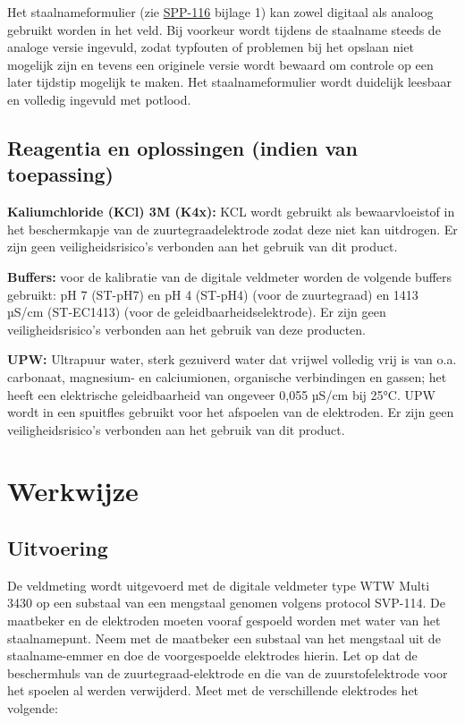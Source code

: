 \documentclass[
]{scrreprt}
\begin{document}
Het staalnameformulier (zie \href{https://drive.google.com/file/d/1OH-WAQrHLDaW5CV8w2sUaVBPVGaEPqe5/view}{SPP-116} bijlage 1) kan zowel digitaal als analoog gebruikt worden in het veld.
Bij voorkeur wordt tijdens de staalname steeds de analoge versie ingevuld, zodat typfouten of problemen bij het opslaan niet mogelijk zijn en tevens een originele versie wordt bewaard om controle op een later tijdstip mogelijk te maken.
Het staalnameformulier wordt duidelijk leesbaar en volledig ingevuld met potlood.

\hypertarget{reagentia}{%
\section{Reagentia en oplossingen (indien van toepassing)}\label{reagentia}}

\textbf{Kaliumchloride (KCl) 3M (K4x):} KCL wordt gebruikt als bewaarvloeistof in het beschermkapje van de zuurtegraadelektrode zodat deze niet kan uitdrogen.
Er zijn geen veiligheidsrisico's verbonden aan het gebruik van dit product.

\textbf{Buffers:} voor de kalibratie van de digitale veldmeter worden de volgende buffers gebruikt: pH 7 (ST-pH7) en pH 4 (ST-pH4) (voor de zuurtegraad) en 1413 µS/cm (ST-EC1413) (voor de geleidbaarheidselektrode).
Er zijn geen veiligheidsrisico's verbonden aan het gebruik van deze producten.

\textbf{UPW:} Ultrapuur water, sterk gezuiverd water dat vrijwel volledig vrij is van o.a.
carbonaat, magnesium- en calciumionen, organische verbindingen en gassen; het heeft een elektrische geleidbaarheid van ongeveer 0,055 µS/cm bij 25°C.
UPW wordt in een spuitfles gebruikt voor het afspoelen van de elektroden.
Er zijn geen veiligheidsrisico's verbonden aan het gebruik van dit product.

\hypertarget{werkwijze}{%
\chapter{Werkwijze}\label{werkwijze}}

\hypertarget{uitvoering}{%
\section{Uitvoering}\label{uitvoering}}

De veldmeting wordt uitgevoerd met de digitale veldmeter type WTW Multi 3430 op een substaal van een mengstaal genomen volgens protocol SVP-114.
De maatbeker en de elektroden moeten vooraf gespoeld worden met water van het staalnamepunt.
Neem met de maatbeker een substaal van het mengstaal uit de staalname-emmer en doe de voorgespoelde elektrodes hierin.
Let op dat de beschermhuls van de zuurtegraad-elektrode en die van de zuurstofelektrode voor het spoelen al werden verwijderd.
Meet met de verschillende elektrodes het volgende:
\end{document}
